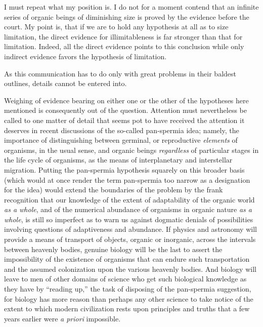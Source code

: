 \documentclass[a4paper, 11pt, oneside, polutonikogreek, english]{article}
\begin{document}
I must repeat what my position is. I do not for a moment contend that an infinite series of organic beings of diminishing size is proved by the evidence before the court. My point is, that if we are to hold any hypothesis at all as to size limitation, the direct evidence for illimitableness is far stronger than that for limitation. Indeed, all the direct evidence points to this conclusion while only indirect evidence favors the hypothesis of limitation.

As this communication has to do only with great problems in their baldest outlines, details cannot be entered into.

Weighing of evidence bearing on either one or the other of the hypotheses here mentioned is consequently out of the question. Attention must nevertheless be called to one matter of detail that seems pot to have received the attention it deserves in recent discussions of the so-called pan-spermia idea; namely, the importance of distinguishing between germinal, or reproductive \emph{elements} of organisms, in the usual sense, and organic beings \emph{regardless} of particular stages in the life cycle of organisms, as the means of interplanetary and interstellar migration. Putting the pan-spermia hypothesis squarely on this broader basis (which would at once render the term pan-spermia too narrow as a designation for the idea) would extend the boundaries of the problem by the frank recognition that our knowledge of the extent of adaptability of the organic world \emph{as a whole}, and of the numerical abundance of organisms in organic nature \emph{as a whole}, is still so imperfect as to warn us against dogmatic denials of possibilities involving questions of adaptiveness and abundance. If physics and astronomy will provide a means of transport of objects, organic or inorganic, across the intervals between heavenly bodies, genuine biology will be the last to assert the impossibility of the existence of organisms that can endure such transportation and the assumed colonization upon the various heavenly bodies. And biology will leave to men of other domains of science who get such biological knowledge as they have by ``reading up,'' the task of disposing of the pan-spermia suggestion, for biology has more reason than perhaps any other science to take notice of the extent to which modern civilization rests upon principles and truths that a few years earlier were \emph{a priori} impossible.

\subsection{}
\end{document}
